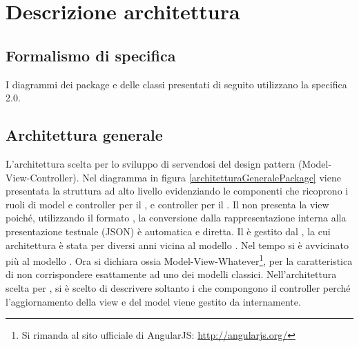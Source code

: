 \section{Descrizione architettura}


\subsection{Formalismo di specifica}

I diagrammi dei package e delle classi presentati di seguito utilizzano la specifica  2.0.

\subsection{Architettura generale}

L'architettura scelta per lo sviluppo di \ProjectName{} servendosi del design pattern  (Model-View-Controller). Nel diagramma in figura \ref{architetturaGeneralePackage} viene presentata la struttura ad alto livello evidenziando le componenti che ricoprono i ruoli di model e controller per il , e controller per il . Il  non presenta la view poiché, utilizzando il formato , la conversione dalla rappresentazione interna alla presentazione testuale (JSON) è automatica e diretta.
Il  è gestito dal  , la cui architettura è stata per diversi anni vicina al modello . Nel tempo si è avvicinato più al modello . Ora  si dichiara  ossia Model-View-Whatever\footnote{Si rimanda al sito ufficiale di AngularJS: \url{http://angularjs.org/}}, per la caratteristica di non corrispondere esattamente ad uno dei modelli classici. Nell'architettura scelta per \ProjectName, si è scelto di descrivere soltanto i  che compongono il controller perché l'aggiornamento della view e del model viene gestito da  internamente.

